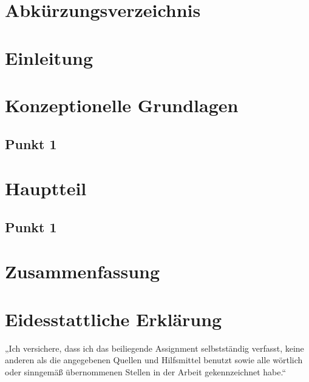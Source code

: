 
\usepackage[colorinlistoftodos, ngerman]{todonotes}\setlength{\marginparwidth}{2cm}\reversemarginpar
\setlength{\bibitemsep}{10pt plus 0.3ex}
\newcommand{\insertref}[1]{\todo[color=green!40]{#1}}
\newcommand{\rewritetxt}[1]{\todo[color=blue!50]{#1}}
\newcommand{\layout}[1]{\todo[color=red!50]{#1}}


\tableofcontents
\setcounter{page}{1}
\newpage
\listoffigures
\newpage
\listoftables
\newpage
\setcounter{secnumdepth}{-1}
\section{Abkürzungsverzeichnis}
\begin{acronym}[Bash]
\end{acronym}
\newpage

 
\setcounter{secnumdepth}{2}
\section{Einleitung} 


\newpage

\section{Konzeptionelle Grundlagen}
\subsection{Punkt 1}

\newpage
\section{Hauptteil}
\subsection{Punkt 1} \label{Punkt1}

\section{Zusammenfassung}



\newpage

\printbibliography[title=Literaturverzeichnis]
\newpage
\section*{Eidesstattliche Erklärung}
„Ich versichere, dass ich das beiliegende Assignment selbstständig verfasst, keine anderen als die angegebenen Quellen und Hilfsmittel benutzt sowie alle wörtlich oder sinngemäß übernommenen Stellen in der Arbeit gekennzeichnet habe.“ 


